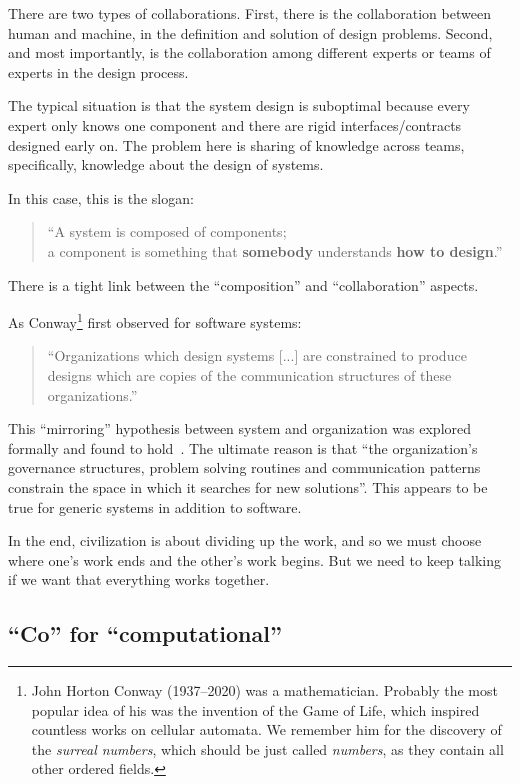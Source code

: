 There are two types of collaborations. First, there is the collaboration between human and machine, in the definition and solution of design problems. Second, and most importantly, is the collaboration among different experts or teams of experts in the design process.

The typical situation is that the system design is suboptimal because every expert only knows one component and there are rigid interfaces/contracts designed early on. The problem here is sharing of knowledge across teams, specifically, knowledge about the design of systems.

In this case, this is the slogan:

\begin{quote}
    \enquote{A system is composed of components;\\
    a component is something that \textbf{somebody} understands
    \textbf{how to design}.}
\end{quote}


There is a tight link between the ``composition'' and ``collaboration'' aspects.

As Conway\footnote{John Horton Conway (1937--2020) was a mathematician. Probably the most
popular idea of his was the invention of the Game of Life, which inspired countless
works on cellular automata. We remember him for the discovery of the \emph{surreal numbers},
    which should be just called \emph{numbers}, as they contain all other ordered fields.} first observed for software systems:

\begin{quote}
    \enquote{Organizations which design systems [...] are constrained to produce designs which are copies of the communication structures of these organizations.}
\end{quote}


This ``mirroring'' hypothesis between system and organization was explored formally and found to hold~\cite{maccormack12exploring}. The ultimate reason is that ``the organization's governance structures, problem solving routines and communication patterns constrain the space in which it searches for new solutions''. This appears to be true for generic systems in addition to software.

In the end, civilization is about dividing up the work, and so we must choose where one's work ends and the other's work begins. But we need to keep talking if we want that everything works together.

\subsection{``Co'' for ``computational''}

